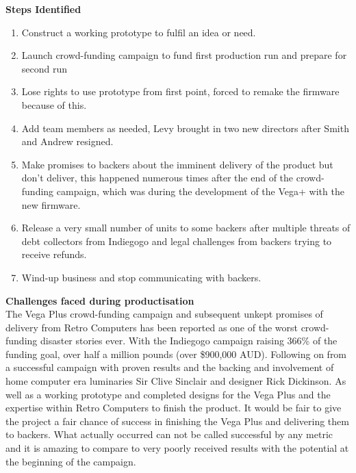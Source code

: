 \textbf{Steps Identified}
\begin{enumerate}
\item Construct a working prototype to fulfil an idea or need.
\item Launch crowd-funding campaign to fund first production run and prepare for second run
\item Lose rights to use prototype from first point, forced to remake the firmware because of this.
\item Add team members as needed, Levy brought in two new directors after Smith and Andrew resigned.
\item Make promises to backers about the imminent delivery of the product but don't deliver, this happened numerous times after the end of the crowd-funding campaign, which was during the development of the Vega+ with the new firmware.
\item Release a very small number of units to some backers after multiple threats of debt collectors from Indiegogo and legal challenges from backers trying to receive refunds.
\item Wind-up business and stop communicating with backers.
\end{enumerate} 

\textbf{Challenges faced during productisation}\\
The Vega Plus crowd-funding campaign and subsequent unkept promises of delivery from Retro Computers has been reported as one of the worst crowd-funding disaster stories ever. With the Indiegogo campaign raising 366\% of the funding goal, over half a million pounds (over \$900,000 AUD). Following on from a successful campaign with proven results and the backing and involvement of home computer era luminaries Sir Clive Sinclair and designer Rick Dickinson. As well as a working prototype and completed designs for the Vega Plus and the expertise within Retro Computers to finish the product. It would be fair to give the project a fair chance of success in finishing the Vega Plus and delivering them to backers. What actually occurred can not be called successful by any metric and it is amazing to compare to very poorly received results with the potential at the beginning of the campaign.

